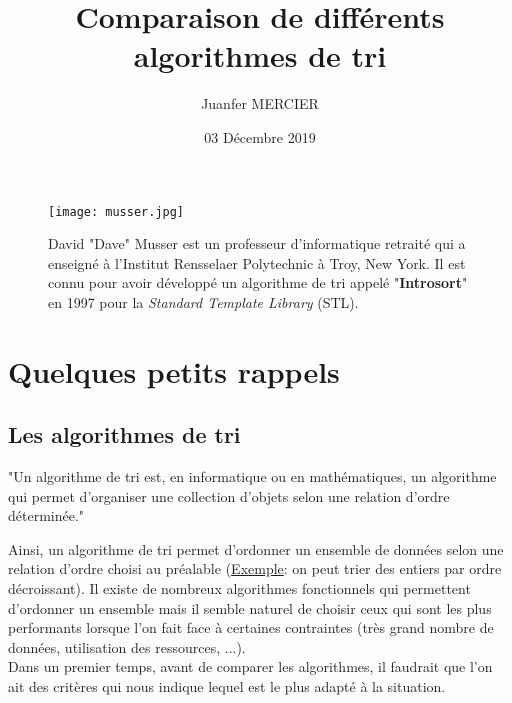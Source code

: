 \documentclass[12pt]{article}
\title{\textbf{Comparaison de différents algorithmes de tri}}
\author{Juanfer MERCIER}
\date{03 Décembre 2019}
\begin{document}
	\maketitle
	\vspace{-0.4cm}
	\begin{figure}[hbt!]
		\centering
		\texttt{[image: musser.jpg]}
		\caption*{David "Dave" Musser est un professeur d'informatique retraité qui a enseigné à l'Institut Rensselaer Polytechnic à Troy, New York. Il est connu pour avoir développé un algorithme de tri appelé "\textbf{Introsort}" en 1997 pour la \textit{Standard Template Library} (STL).}
	\end{figure}
	\flushleft

	\renewcommand{\contentsname}{Sommaire}
	\tableofcontents
	\newpage
	
	\justify
	\section{Quelques petits rappels}
		\subsection{Les algorithmes de tri}
			\begin{history}
				"Un algorithme de tri est, en informatique ou en mathématiques, un algorithme qui permet d'organiser une collection d'objets selon une relation d'ordre déterminée."
			\end{history}
			
			Ainsi, un algorithme de tri permet d'ordonner un ensemble de données selon une relation d'ordre choisi au préalable (\underline{Exemple}: on peut trier des entiers par ordre décroissant).
			Il existe de nombreux algorithmes fonctionnels qui permettent d'ordonner un ensemble mais il semble naturel de choisir ceux qui sont les plus performants lorsque l'on fait face à certaines contraintes (très grand nombre de données, utilisation des ressources, ...). \\
			
			Dans un premier temps, avant de comparer les algorithmes, il faudrait que l'on ait des critères qui nous indique lequel est le plus adapté à la situation.
			
\end{document}
